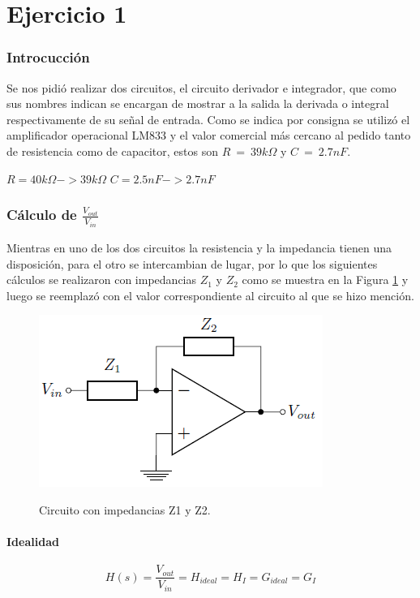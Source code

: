 \documentclass[11pt, a4paper]{article}
\begin{document}
\part{Ejercicio 1}
\section{Introcucción}
	Se nos pidió realizar dos circuitos, el circuito derivador e integrador, que como sus nombres indican se encargan de mostrar a la salida la derivada  o integral respectivamente de su señal de entrada.
	Como se indica por consigna se utilizó el amplificador operacional LM833 y el valor comercial más cercano al pedido tanto de resistencia como de capacitor, estos son $R \ = \ 39k \Omega$ y $C \ = \ 2.7 nF$.

$R=40k\Omega -> 39k \Omega$
$C = 2.5 nF -> 2.7 nF$
\section{Cálculo de $\frac{V_{out}}{V_{in}}$}
Mientras en uno de los dos circuitos la resistencia y la impedancia tienen una disposición, para el otro se intercambian de lugar, por lo que los siguientes cálculos se realizaron con impedancias $Z_1$ y $Z_2 $ como se muestra en la Figura \ref{circconz1z2} y luego se reemplazó con el valor correspondiente al circuito al que se hizo mención.

\begin{figure}[h!]
\centering
\includegraphics[scale=0.5]{circconz1z2.png}
\label{circconz1z2}
\caption{Circuito con impedancias Z1 y Z2.}
\end{figure}


\subsection{Idealidad}
\begin{equation}
	H(s) = \dfrac{V_{out}}{V_{in}} = H_{ideal} = H_I= G_{ideal} = G_I 
\end{equation}
\end{document}
